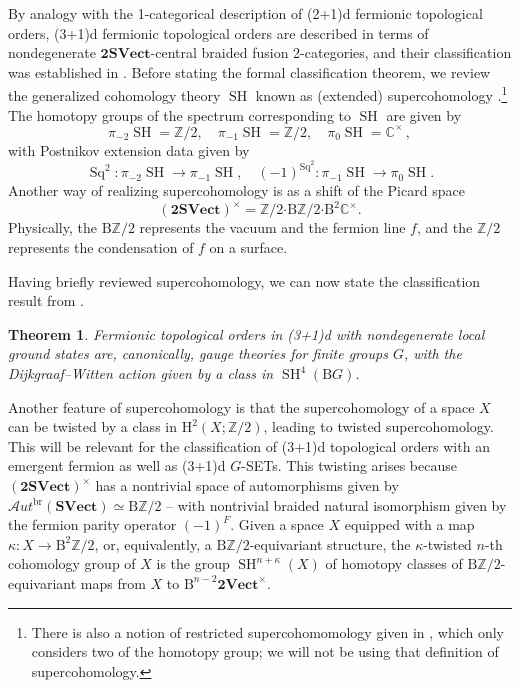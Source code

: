 \documentclass[11pt,reqno]{amsart}
\DeclareMathOperator{\Sq}{Sq}
\newcommand{\Z}{\mathbb{Z}}
\DeclareMathOperator{\SH}{SH}
\newcommand{\tVect}{\mathbf{2Vect}}
\newcommand{\SVect}{\mathbf{SVect}}
\newcommand{\tSVect}{\mathbf{2SVect}}
\newcommand{\sAut}{\mathscr{A}ut}
\newcommand{\rH}{\mathrm{H}}
\newcommand{\rB}{\mathrm{B}}
\numberwithin{equation}{section}
\theoremstyle{plain}
\newtheorem{thm}[equation]{Theorem}
\theoremstyle{definition}
\begin{document}
By analogy with the 1-categorical description of (2+1)d fermionic topological orders, (3+1)d fermionic topological orders  are described in terms of nondegenerate $\mathbf{2SVect}$-central braided fusion 2-categories, and their classification was established in \cite{JF}. Before stating the formal classification theorem, we review the generalized 
cohomology theory $\SH$ known as (extended) supercohomology \cite{Wang:2017moj}.\footnote{There is also a notion of restricted supercohomomology given in \cite{Freed:2006mx,Gu:2012ib}, which only considers two of the homotopy group; we will not be using that definition of supercohomology.} The homotopy groups of the spectrum corresponding to $\SH$ are given by
\begin{equation}
    \pi_{-2}\SH = \Z/2 , \quad  \pi_{-1}\SH = \Z/2, \quad  \pi_{0}\SH = \mathbb C^\times\,,
\end{equation}
with Postnikov extension data given by
\begin{equation}\label{eq:postnikov}
    \Sq^2:\pi_{-2}\SH \rightarrow \pi_{-1}\SH, \quad (-1)^{\Sq^2}:\pi_{-1}\SH \rightarrow \pi_{0}\SH.
\end{equation}
Another way of realizing supercohomology is as a shift of the Picard space 
\begin{equation}\label{eq:2SVectgroups}
    (\tSVect)^\times = \Z/2\boldsymbol{\cdot}\rB\Z/2\boldsymbol{\cdot}\rB^2 \mathbb{C}^\times.
\end{equation}
Physically, the $\rB\Z/2$ represents the vacuum and the fermion line $f$, and the $\Z/2$ represents the condensation of $f$ on a surface.

Having briefly reviewed supercohomology, we can now state the classification result from \cite{JF}.

\begin{thm}{\cite[Corollary V.4]{JF}}\label{thm:fermionicTQFT}
    Fermionic topological orders in (3+1)d with nondegenerate local ground states are, canonically, gauge theories for finite groups $G$, with the Dijkgraaf–Witten action given by a class in $\SH^4(\rB G)$.
\end{thm}

Another feature of supercohomology  is that the  supercohomology of a space $X$ can be twisted by a class in $\rH^2(X;\Z/2)$, leading to twisted supercohomology. This will be relevant for the classification of (3+1)d topological orders with an emergent fermion as well as (3+1)d $G$-SETs. This twisting arises because $(\tSVect)^\times$ has a nontrivial space of automorphisms given by $\sAut^{\mathrm{br}}(\SVect) \simeq \rB \Z/2$ -- with nontrivial braided natural isomorphism given by the fermion parity operator $(-1)^F$. Given a space $X$ equipped with a map $\kappa:X\to  \rB^2\Z/2$, or, equivalently, a $\rB\Z/2$-equivariant structure, the $\kappa$-twisted $n$-th cohomology group of $X$ is the group $\SH^{n+\kappa}(X)$ of homotopy classes of $\rB\Z/2$-equivariant maps from $X$ to $\rB^{n-2}\tVect^\times$.
\end{document}
